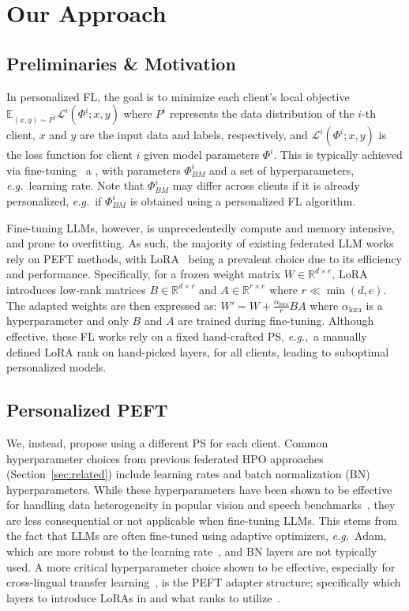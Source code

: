 \section{Our Approach}\label{sec:main}


\subsection{Preliminaries \& Motivation}

In personalized FL, the goal is to minimize each client's local objective $\mathbb{E}_{(x,y) \sim P^i}\mathcal{L}^i(\Phi^i;x,y)$ where $P^i$ represents the data distribution of the $i$-th client, $x$ and $y$ are the input data and labels, respectively, and $\mathcal{L}^i(\Phi^i;x,y)$ is the loss function for client $i$ given model parameters $\Phi^i$. This is typically achieved via fine-tuning~\cite{matsuda2022empirical,chen2022pfl} a \basemodel{}, with parameters $\Phi^i_{BM}$ and a set of hyperparameters, \textit{e.g.}~learning rate. Note that $\Phi^i_{BM}$ may differ across clients if it is already personalized, \textit{e.g.}~if $\Phi^i_{BM}$ is obtained using a personalized FL algorithm.

Fine-tuning LLMs, however, is unprecedentedly compute and memory intensive, and prone to overfitting. As such, the majority of existing federated LLM works~\cite{zhao2023breaking,fedpeft} rely on PEFT methods, with LoRA~\cite{hu2021lora} being a prevalent choice due to its efficiency and performance. Specifically, for a frozen weight matrix $W \in \mathbb{R}^{d\times e}$, LoRA introduces low-rank matrices $B \in \mathbb{R}^{d \times r}$ and $A \in \mathbb{R}^{r \times e}$ where $r \ll \min(d, e)$. The adapted weights are then expressed as: $W' = W + \frac{\alpha_{\text{lora}}}{r}BA$ where $\alpha_{\text{lora}}$ is a hyperparameter and only $B$ and $A$ are trained during fine-tuning.
Although effective, these FL works rely on a fixed hand-crafted PS, \textit{e.g.},~a manually defined LoRA rank on hand-picked layers, for all clients, leading to suboptimal personalized models. 

\subsection{Personalized PEFT}\label{sec:personalized_peft}

We, instead, propose using a different PS for each client. Common hyperparameter choices from previous federated HPO approaches (Section~\ref{sec:related}) include learning rates and batch normalization (BN) hyperparameters. While these hyperparameters have been shown to be effective for handling data heterogeneity in popular vision and speech benchmarks~\cite{fedbn,li2016revisiting,fedper}, they are less consequential or not applicable when fine-tuning LLMs. This stems from the fact that LLMs are often fine-tuned using adaptive optimizers, \textit{e.g.}~Adam, which are more robust to the learning rate~\cite{zhao2025deconstructing}, and BN layers are not typically used. 
A more critical hyperparameter choice shown to be effective, especially for cross-lingual transfer learning~\cite{pfeiffer2020mad}, is the PEFT adapter structure; specifically which layers to introduce LoRAs in and what ranks to utilize~\cite{adalora,autolora}. 

